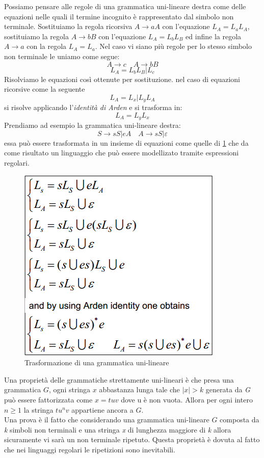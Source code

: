 Possiamo pensare alle regole di una grammatica uni-lineare destra come delle equazioni nelle quali il termine incognito è rappresentato dal simbolo non terminale. Sostituiamo la regola ricorsiva $ A\rightarrow aA $ con l'equazione $ L_A=L_aL_A $, sostituiamo la regola $ A\rightarrow bB $ con l'equazione $ L_A=L_bL_B $ ed infine la regola $ A\rightarrow a $ con la regola $ L_A = L_a $. Nel caso vi siano più regole per lo stesso simbolo non terminale le uniamo come segue:
$$A\rightarrow c \quad A\rightarrow bB$$
$$L_A= L_bL_B|L_c$$
Risolviamo le equazioni così ottenute per sostituzione. nel caso di equazioni ricorsive come la seguente
$$L_A=L_x|L_yL_A$$
si risolve applicando l'\emph{identità di Arden} e si trasforma in:
$$L_A=L_yL_x$$
Prendiamo ad esempio la grammatica uni-lineare destra:
$$S\rightarrow sS|eA \quad A\rightarrow sS|\varepsilon$$
essa può essere trasformata in un insieme di equazioni come quelle di \figurename \ref{fig:equagram} che da come risultato un linguaggio che può essere modellizato tramite espressioni regolari.
\begin{figure}
	\centering
	\includegraphics[width=0.35\linewidth]{img/equagram.png}
	\caption{Trasformazione di una grammatica uni-lineare}\label{fig:equagram}
\end{figure}
Una proprietà delle grammatiche strettamente uni-lineari è che presa una grammatica $ G $, ogni stringa $ x $ abbastanza lunga tale che $ |x| > k $ generata da \emph{G} può essere fattorizzata come $ x=tuv $ dove u è non vuota. Allora per ogni intero $ n\geq 1 $ la stringa $ tu^nv $ appartiene ancora a $ G $.\\
Una prova è il fatto che considerando una grammatica uni-lineare $ G $ composta da \emph{k} simboli non terminali e una stringa \emph{x} di lunghezza maggiore di \emph{k} allora sicuramente vi sarà un non terminale ripetuto.
Questa proprietà è dovuta al fatto che nei linguaggi regolari le ripetizioni sono inevitabili.
